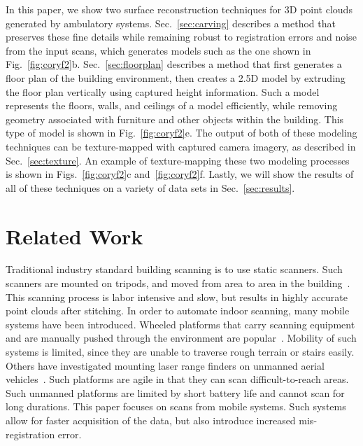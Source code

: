 \documentclass[10pt,twocolumn,twoside]{IEEEtran}
\begin{document}
In this paper, we show two surface reconstruction techniques for 3D point clouds generated by ambulatory systems.  Sec.~\ref{sec:carving} describes a method that preserves these fine details while remaining robust to registration errors and noise from the input scans, which generates models such as the one shown in Fig.~\ref{fig:coryf2}b.  Sec.~\ref{sec:floorplan} describes a method that first generates a floor plan of the building environment, then creates a 2.5D model by extruding the floor plan vertically using captured height information.  Such a model represents the floors, walls, and ceilings of a model efficiently, while removing geometry associated with furniture and other objects within the building.  This type of model is shown in Fig.~\ref{fig:coryf2}e.  The output of both of these modeling techniques can be texture-mapped with captured camera imagery, as described in Sec.~\ref{sec:texture}.  An example of texture-mapping these two modeling processes is shown in Figs.~\ref{fig:coryf2}c and~\ref{fig:coryf2}f.  Lastly, we will show the results of all of these techniques on a variety of data sets in Sec.~\ref{sec:results}.

\section{Related Work}
\label{sec:background}

Traditional industry standard building scanning is to use static scanners.  Such scanners are mounted on tripods, and moved from area to area in the building~\cite{Mattausch14,Mura13,RoomSegmentation,HistWallRecon,BasicPlaneFit}. This scanning process is labor intensive and slow, but results in highly accurate point clouds after stitching.  In order to automate indoor scanning, many mobile systems have been introduced.  Wheeled platforms that carry scanning equipment and are manually pushed through the environment are popular~\cite{Carving, ProbabilisticRobotics}.  Mobility of such systems is limited, since they are unable to traverse rough terrain or stairs easily.  Others have investigated mounting laser range finders on unmanned aerial vehicles~\cite{Quadrotor,QuadrotorMIT}.  Such platforms are agile in that they can scan difficult-to-reach areas.  Such unmanned platforms are limited by short battery life and cannot scan for long durations.  This paper focuses on scans from mobile systems.  Such systems allow for faster acquisition of the data, but also introduce increased mis-registration error.
\end{document}
